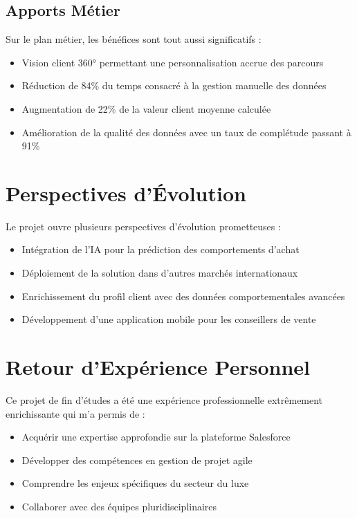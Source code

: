 \subsection{Apports Métier}

Sur le plan métier, les bénéfices sont tout aussi significatifs :

\begin{itemize}
    \item Vision client 360° permettant une personnalisation accrue des parcours
    \item Réduction de 84\% du temps consacré à la gestion manuelle des données
    \item Augmentation de 22\% de la valeur client moyenne calculée
    \item Amélioration de la qualité des données avec un taux de complétude passant à 91\%
\end{itemize}

\section{Perspectives d'Évolution}

Le projet ouvre plusieurs perspectives d'évolution prometteuses :

\begin{itemize}
    \item Intégration de l'IA pour la prédiction des comportements d'achat
    \item Déploiement de la solution dans d'autres marchés internationaux
    \item Enrichissement du profil client avec des données comportementales avancées
    \item Développement d'une application mobile pour les conseillers de vente
\end{itemize}

\section{Retour d'Expérience Personnel}

Ce projet de fin d'études a été une expérience professionnelle extrêmement enrichissante qui m'a permis de :

\begin{itemize}
    \item Acquérir une expertise approfondie sur la plateforme Salesforce
    \item Développer des compétences en gestion de projet agile
    \item Comprendre les enjeux spécifiques du secteur du luxe
    \item Collaborer avec des équipes pluridisciplinaires
\end{itemize}


